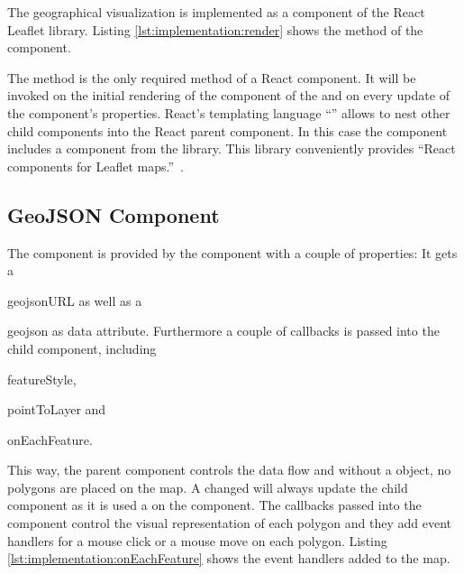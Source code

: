 The geographical visualization is implemented as a  component of the React Leaflet library.
Listing \ref{lst:implementation:render} shows the  method of the component.



The  method is the only required method of a React component.
It will be invoked on the initial rendering of the component of the  and on every update of the component's properties.
React's templating language ``'' allows to nest other child components into the React parent component.
In this case the  component includes a   component from the  library.
This library conveniently provides ``React components for Leaflet maps.''~\cite{ReactLeaflet2017}.

\subsection{GeoJSON Component}

The  component is provided by the  component with a couple of properties:
It gets a
\begin{enumerate*}[label=(\arabic*)]
  \item
    geojsonURL as well as a
  \item
    geojson as data attribute. Furthermore a couple of callbacks is passed into the child component, including
  \item
    featureStyle,
  \item
    pointToLayer and
  \item
    onEachFeature.
\end{enumerate*}

This way, the parent  component controls the data flow and without a  object, no polygons are placed on the map.
A changed  will always update the child component as it is used a  on the  component.
The callbacks passed into the  component control the visual representation of each polygon and they add event handlers for a mouse click or a mouse move on each polygon.
Listing \ref{lst:implementation:onEachFeature} shows the event handlers added to the map.



